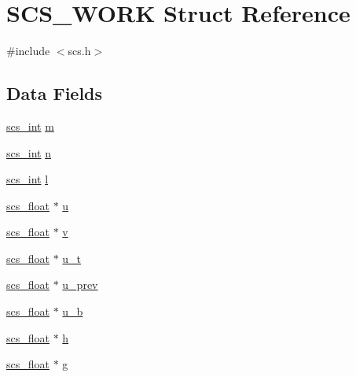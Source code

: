 \hypertarget{struct_s_c_s___w_o_r_k}{\section{S\-C\-S\-\_\-\-W\-O\-R\-K Struct Reference}
\label{struct_s_c_s___w_o_r_k}
}


{\ttfamily \#include $<$scs.\-h$>$}

\subsection*{Data Fields}
\begin{DoxyCompactItemize}
\item 
\hyperlink{glbopts_8h_a23c48a83ce0c58783595ad45ffcaf76b}{scs\-\_\-int} \hyperlink{struct_s_c_s___w_o_r_k_a789378d94292c785137f4e251424caa6}{m}
\item 
\hyperlink{glbopts_8h_a23c48a83ce0c58783595ad45ffcaf76b}{scs\-\_\-int} \hyperlink{struct_s_c_s___w_o_r_k_a3c52343d851d6f6d3607e1ac2ce970a4}{n}
\item 
\hyperlink{glbopts_8h_a23c48a83ce0c58783595ad45ffcaf76b}{scs\-\_\-int} \hyperlink{struct_s_c_s___w_o_r_k_a597806c444b40c7af22a76f3324b220f}{l}
\item 
\hyperlink{glbopts_8h_ad37836e6404bb2c3ae8adcc6290699b9}{scs\-\_\-float} $\ast$ \hyperlink{struct_s_c_s___w_o_r_k_a991bc82cd3e84ce1ac7d3625b051a577}{u}
\item 
\hyperlink{glbopts_8h_ad37836e6404bb2c3ae8adcc6290699b9}{scs\-\_\-float} $\ast$ \hyperlink{struct_s_c_s___w_o_r_k_a9549b72c9049c21af513af6c07aecf50}{v}
\item 
\hyperlink{glbopts_8h_ad37836e6404bb2c3ae8adcc6290699b9}{scs\-\_\-float} $\ast$ \hyperlink{struct_s_c_s___w_o_r_k_a199e1e4e48020d89df08be36af7749eb}{u\-\_\-t}
\item 
\hyperlink{glbopts_8h_ad37836e6404bb2c3ae8adcc6290699b9}{scs\-\_\-float} $\ast$ \hyperlink{struct_s_c_s___w_o_r_k_af90331bf1e7921c168c0877ffe3b9144}{u\-\_\-prev}
\item 
\hyperlink{glbopts_8h_ad37836e6404bb2c3ae8adcc6290699b9}{scs\-\_\-float} $\ast$ \hyperlink{struct_s_c_s___w_o_r_k_add22e29c01511a45f085a438a2c8efd5}{u\-\_\-b}
\item 
\hyperlink{glbopts_8h_ad37836e6404bb2c3ae8adcc6290699b9}{scs\-\_\-float} $\ast$ \hyperlink{struct_s_c_s___w_o_r_k_a2859089462bc7724fcf3d817aab2ecf5}{h}
\item 
\hyperlink{glbopts_8h_ad37836e6404bb2c3ae8adcc6290699b9}{scs\-\_\-float} $\ast$ \hyperlink{struct_s_c_s___w_o_r_k_a98beb00e34a6cbcf9b9072093641f814}{g}

\end{DoxyCompactItemize}
